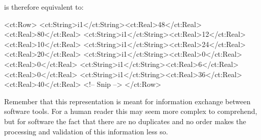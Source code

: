 \documentclass[a4paper,11pt]{article}
\begin{document}
%
is therefore equivalent to:
\begin{xmlcode}
<ct:Row>
    <ct:String>i1</ct:String><ct:Real>48</ct:Real><ct:Real>80</ct:Real>
    <ct:String>i1</ct:String><ct:Real>12</ct:Real><ct:Real>10</ct:Real>
    <ct:String>i1</ct:String><ct:Real>24</ct:Real><ct:Real>20</ct:Real>
    <ct:String>i1</ct:String><ct:Real>0</ct:Real><ct:Real>0</ct:Real>
    <ct:String>i1</ct:String><ct:Real>6</ct:Real><ct:Real>0</ct:Real>
    <ct:String>i1</ct:String><ct:Real>36</ct:Real><ct:Real>40</ct:Real>
    <!-- Snip -->
</ct:Row>
\end{xmlcode}
%
Remember that this representation is meant for information exchange
between software tools. For a human reader this may seem more complex
to comprehend, but for software the fact that there are no duplicates
and no order makes the processing and validation of this information
less so.
\end{document}
